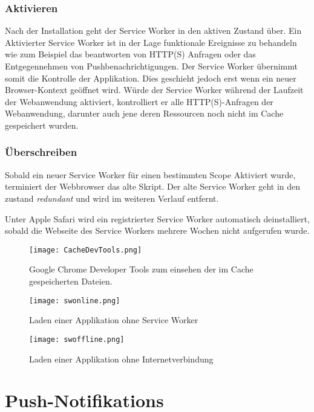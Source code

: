 \subsubsection{Aktivieren}

Nach der Installation geht der Service Worker in den aktiven Zustand über. Ein Aktivierter Service Worker ist in der Lage funktionale Ereignisse zu behandeln wie zum Beispiel das beantworten von HTTP(S) Anfragen oder das Entgegennehmen von Pushbenachrichtigungen. 
Der Service Worker übernimmt somit die Kontrolle der Applikation. Dies geschieht jedoch erst wenn ein neuer Browser-Kontext geöffnet wird. Würde der Service Worker während der Laufzeit der Webanwendung aktiviert, kontrolliert er alle HTTP(S)-Anfragen der Webanwendung, darunter auch jene deren Ressourcen noch nicht im Cache gespeichert wurden.

\subsubsection{Überschreiben}

Sobald ein neuer Service Worker für einen bestimmten Scope Aktiviert wurde, terminiert der Webbrowser das alte Skript. Der alte Service Worker geht in den zustand \textit{redundant} und wird im weiteren Verlauf entfernt. 

Unter Apple Safari wird ein registrierter Service Worker automatisch deinstalliert, sobald die Webseite des Service Workers mehrere Wochen nicht aufgerufen wurde. 


\begin{figure}[!htb]
    \centering
    \texttt{[image: CacheDevTools.png]}
    \caption{Google Chrome Developer Tools zum einsehen der im Cache gespeicherten Dateien.}
    \label{img:CacheDevTools}
\end{figure}

\begin{figure}[!htb]
    \centering
    \texttt{[image: swonline.png]}
    \caption{Laden einer Applikation ohne Service Worker}
    \label{img:swonline}
\end{figure}

\begin{figure}[!htb]
    \centering
    \texttt{[image: swoffline.png]}
    \caption{Laden einer Applikation ohne Internetverbindung}
    \label{img:swoffline}
\end{figure}


\clearpage
\section{Push-Notifikations}

